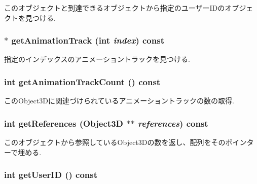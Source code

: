 このオブジェクトと到達できるオブジェクトから指定のユーザーIDのオブジェクトを見つける. \hypertarget{classm3g_1_1Object3D_f0978f3f2efe3227ca613da3361424dd}{
\subsubsection[{getAnimationTrack}]{ $\ast$ getAnimationTrack (int {\em index}) const}}
\label{classm3g_1_1Object3D_f0978f3f2efe3227ca613da3361424dd}


指定のインデックスのアニメーショントラックを見つける. \hypertarget{classm3g_1_1Object3D_0926843b66090795972850376b8e4e6c}{
\subsubsection[{getAnimationTrackCount}]{\setlength{\rightskip}{0pt plus 5cm}int getAnimationTrackCount () const}}
\label{classm3g_1_1Object3D_0926843b66090795972850376b8e4e6c}


このObject3Dに関連づけられているアニメーショントラックの数の取得. \hypertarget{classm3g_1_1Object3D_d52d3c63076c4341b34c3631a17820e4}{
\subsubsection[{getReferences}]{\setlength{\rightskip}{0pt plus 5cm}int getReferences ({\bf Object3D} $\ast$$\ast$ {\em references}) const}}
\label{classm3g_1_1Object3D_d52d3c63076c4341b34c3631a17820e4}


このオブジェクトから参照しているObject3Dの数を返し、配列をそのポインターで埋める. \hypertarget{classm3g_1_1Object3D_b8d9067364251d0208fcdc502d394e2c}{
\subsubsection[{getUserID}]{\setlength{\rightskip}{0pt plus 5cm}int getUserID () const}}
\label{classm3g_1_1Object3D_b8d9067364251d0208fcdc502d394e2c}


